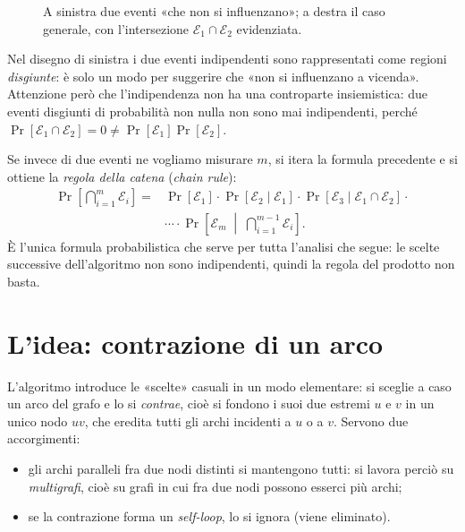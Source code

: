 \begin{figure}[H]
  \centering
  
  \caption{A sinistra due eventi «che non si influenzano»; a destra il caso generale, con
  l'intersezione $\mathcal{E}_1\cap\mathcal{E}_2$ evidenziata.}
  \label{fig:prob-condizionata-venn}
\end{figure}

\begin{osservazione}
Nel disegno di sinistra i due eventi indipendenti sono rappresentati come regioni
\emph{disgiunte}: è solo un modo per suggerire che «non si influenzano a vicenda».
Attenzione però che l'indipendenza non ha una controparte insiemistica: due eventi disgiunti
di probabilità non nulla non sono mai indipendenti, perché
$\Pr[\mathcal{E}_1\cap\mathcal{E}_2]=0\neq\Pr[\mathcal{E}_1]\Pr[\mathcal{E}_2]$.
\end{osservazione}

Se invece di due eventi ne vogliamo misurare $m$, si itera la formula precedente e si
ottiene la \emph{regola della catena} (\emph{chain rule}):
\begin{align*}
  \Pr\!\left[\bigcap_{i=1}^{m}\mathcal{E}_i\right]
  ={}& \Pr[\mathcal{E}_1]\cdot\Pr[\mathcal{E}_2\mid\mathcal{E}_1]\cdot
       \Pr[\mathcal{E}_3\mid\mathcal{E}_1\cap\mathcal{E}_2]\cdot{}\\
     & \cdots\cdot
       \Pr\!\left[\mathcal{E}_m\;\middle|\;\bigcap_{i=1}^{m-1}\mathcal{E}_i\right].
\end{align*}
È l'unica formula probabilistica che serve per tutta l'analisi che segue: le scelte
successive dell'algoritmo non sono indipendenti, quindi la regola del prodotto non basta.

\section{L'idea: contrazione di un arco}

L'algoritmo introduce le «scelte» casuali in un modo elementare: si sceglie a caso un arco
del grafo e lo si \emph{contrae}, cioè si fondono i suoi due estremi $u$ e $v$ in un unico
nodo $uv$, che eredita tutti gli archi incidenti a $u$ o a $v$. Servono due accorgimenti:

\begin{itemize}
  \item gli archi paralleli fra due nodi distinti si mantengono tutti: si lavora perciò su
        \emph{multigrafi}, cioè su grafi in cui fra due nodi possono esserci più archi;
  \item se la contrazione forma un \emph{self-loop}, lo si ignora (viene eliminato).
\end{itemize}

